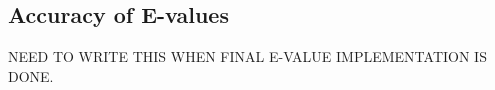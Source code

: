 \subsection{Accuracy of E-values}

NEED TO WRITE THIS WHEN FINAL E-VALUE IMPLEMENTATION IS DONE.

\begin{comment}
First the good news. The extreme value distribution fitting is done
with a rather robust and personally satisfying chunk of maximum
likelihood code (see \prog{histogram.c} in the codebase). The ML
approach was suggested to me by Stephen Altschul, who directed me to a
lovely textbook by Lawless \cite{Lawless82}.  A brief technical report
on \software{Infernal}'s EVD fitting is available at
\htmladdnormallink{ftp://ftp.genetics.wustl.edu/pub/eddy/papers/evd.pdf}
{ftp://ftp.genetics.wustl.edu/pub/eddy/papers/evd.pdf}.  Any EVD
fitting code that is relying on linear regression fits to log-log
plots is bound to be less accurate, judging from my tests.

However, the down side is that most profile CM scores don't fit the
extreme value distribution well. Fully local alignments (models built
with \prog{hmmbuild -f} or \prog{hmmbuild -s} fit the EVD fairly well,
as expected for Smith/Waterman style alignments, for the same reasons
that gapped BLAST or FASTA alignment scores have been shown to be
approximately EVD-distributed. By default, though, \prog{hmmbuild}
makes models for ``glocal'' alignments which are global with respect
to the model, and multi-hit-local with respect to the sequence.  Also
called ``profile scores'' by Waterman, this sort of alignment score is
known not to be EVD-distributed \cite{GoldsteinWaterman94}.

Nonetheless, empirically, the tail of the distribution around E=1 is
falling off more or less like an EVD, and this is the region of
interest. \software{Infernal} does a ``censored EVD fit'' from the peak of the
distribution down to the right tail, and does not include the data to
the left of the peak in its fit. This produces a reasonable fit in the
important region of the scores. Empirically, \software{Infernal} E-values tend to be
accurate in the critical region (E~1), despite the lack of
mathematical foundation.

The end of \prog{cmsearch} output shows you the observed histogram,
and (if the model is calibrated) an expected curve according to the
EVD fit. You should observe that the relevant tail (around E=1) is
more or less well fitted. The bulk of the distribution, particularly
at lower scores, is usually poorly fitted, but this is not the area of
interest.
\end{comment}

